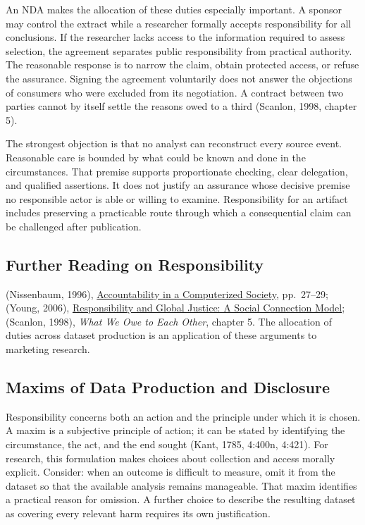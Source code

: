 An NDA makes the allocation of these duties especially important. A
sponsor may control the extract while a researcher formally accepts
responsibility for all conclusions. If the researcher lacks access to
the information required to assess selection, the agreement separates
public responsibility from practical authority. The reasonable response
is to narrow the claim, obtain protected access, or refuse the
assurance. Signing the agreement voluntarily does not answer the
objections of consumers who were excluded from its negotiation. A
contract between two parties cannot by itself settle the reasons owed to
a third (Scanlon, 1998, chapter 5).

The strongest objection is that no analyst can reconstruct every source
event. Reasonable care is bounded by what could be known and done in the
circumstances. That premise supports proportionate checking, clear
delegation, and qualified assertions. It does not justify an assurance
whose decisive premise no responsible actor is able or willing to
examine. Responsibility for an artifact includes preserving a
practicable route through which a consequential claim can be challenged
after publication.

\hypertarget{M09-further-reading-on-responsibility}{%
\subsection*{Further Reading on
Responsibility}\label{M09-further-reading-on-responsibility}}

\noindent (Nissenbaum, 1996),
\href{https://nissenbaum.tech.cornell.edu/papers/AccountabilityinaComputerizedSociety.pdf}{Accountability
in a Computerized Society}, pp.~27--29; (Young, 2006),
\href{https://doi.org/10.1017/S0265052506060043}{Responsibility and
Global Justice: A Social Connection Model}; (Scanlon, 1998), \emph{What
We Owe to Each Other}, chapter 5. The allocation of duties across
dataset production is an application of these arguments to marketing
research.

\hypertarget{M09-maxims-of-data-production-and-disclosure}{%
\subsection{Maxims of Data Production and
Disclosure}\label{M09-maxims-of-data-production-and-disclosure}}

\noindent \noindent Responsibility concerns both an action and the principle under
which it is chosen. A maxim is a subjective principle of action; it can
be stated by identifying the circumstance, the act, and the end sought
(Kant, 1785, 4:400n, 4:421). For research, this formulation makes
choices about collection and access morally explicit. Consider: when an
outcome is difficult to measure, omit it from the dataset so that the
available analysis remains manageable. That maxim identifies a practical
reason for omission. A further choice to describe the resulting dataset
as covering every relevant harm requires its own justification.


